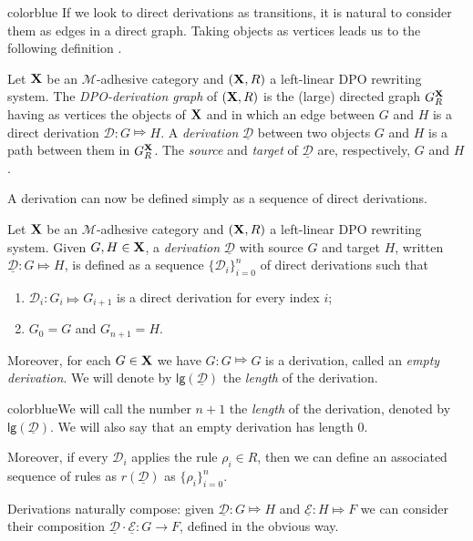 \documentclass[a4paper,UKenglish,cleveref,pdftex, thm-restate,numberwithinsect,anonymous]{lipics}
\newcommand{\full}[1]{{color{blue}#1}}
\newcommand{\full}[1]{}
\def\R{\mathsf{R}}
\def\X{\textbf {\textup{X}}}
\newcommand{\dder}[1]{\mathscr{#1}}
\newcommand{\der}[1]{\underline{\dder{#1}}}
\def\gpo{\mathsf{G}^{\X}_R}
\newcommand{\lgh}[0]{\mathsf{lg}}
\begin{document}
\full{
  If we look to direct derivations as
  transitions, it is natural to consider them as edges in a direct
  graph. Taking objects as vertices leads us to the following
  definition \cite{heindel2009category}.

  \begin{definition}
    Let  $\X$ be an $\mathcal{M}$-adhesive category and 
    $(\X, \R)$ a left-linear DPO rewriting system. 
    The \emph{DPO-derivation graph} of
    $(\X, \R)$ is the (large) directed graph $\gpo$ having as vertices
    the objects of $\X$ and in which an edge between $G$ and $H$ is a
    direct derivation $\dder{D}\colon G\Mapsto H$. A \emph{derivation}
    $\der{D}$ between two objects $G$ and $H$ is a path between them
    in $\gpo$. The \emph{source} and \emph{target} of $\der{D}$ are,
    respectively, $G$ and $H$.
  \end{definition}
}

A derivation can now be defined simply as a sequence of direct derivations.

\begin{definition}[Derivation]
  Let  $\X$ be an $\mathcal{M}$-adhesive category and 
  $(\X, \R)$ a left-linear DPO rewriting system. 
  Given $G, H \in \X$, a \emph{derivation}
  $\der{D}$ with source $G$ and target $H$, written
  $\der{D}: G \Mapsto H$, is defined as a sequence
  $\{\dder{D}_i\}_{i=0}^n$ of direct derivations such that
  \begin{enumerate}
  \item $\dder{D}_i : G_i \Mapsto G_{i+1}$ is a direct derivation for
    every index $i$;
  \item $G_0=G$ and $G_{n+1}=H$.
  \end{enumerate}
  Moreover, for each $G \in \X$ we have $G : G \Mapsto G$ is a
  derivation, called an \emph{empty derivation}.
  We will denote by $\lgh(\der{D})$ the \emph{length} of the derivation.
 
  \full{We will call the number $n+1$ the \emph{length} of the derivation,
  denoted by $\lgh(\der{D})$. We will also say that an empty
  derivation has length $0$.}

  Moreover, if every $\dder{D}_i$ applies the rule $\rho_i\in R$, then
  we can define an associated sequence of rules as $r(\der{D})$ as
  $\{\rho_i\}_{i=0}^n$.
\end{definition}

Derivations naturally compose: given $\der{D}: G \Mapsto H$ and $\der{E}: H \Mapsto F$ we can consider their composition $\der{D} \cdot \der{E}: G \to F$, defined in the obvious way.
\end{document}
